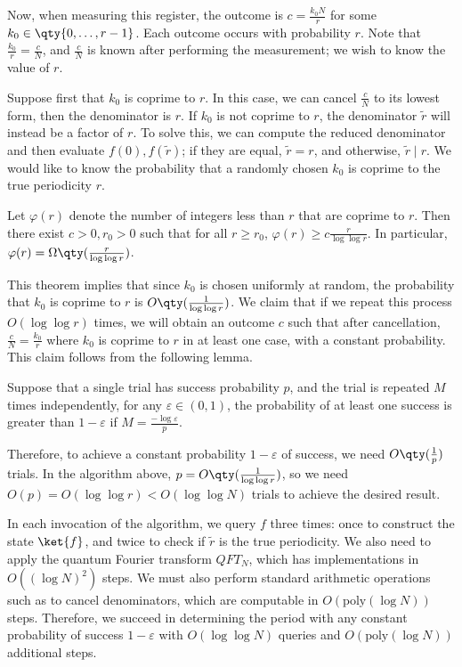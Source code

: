 Now, when measuring this register, the outcome is $c = \frac{k_0N}{r}$ for some $k_0 \in \qty{0, \dots, r-1}$.
Each outcome occurs with probability $r$.
Note that $\frac{k_0}{r} = \frac{c}{N}$, and $\frac{c}{N}$ is known after performing the measurement; we wish to know the value of $r$.

Suppose first that $k_0$ is coprime to $r$.
In this case, we can cancel $\frac{c}{N}$ to its lowest form, then the denominator is $r$.
If $k_0$ is not coprime to $r$, the denominator $\widetilde r$ will instead be a factor of $r$.
To solve this, we can compute the reduced denominator and then evaluate $f(0), f(\widetilde r)$; if they are equal, $\widetilde r = r$, and otherwise, $\widetilde r \mid r$.
We would like to know the probability that a randomly chosen $k_0$ is coprime to the true periodicity $r$.
\begin{theorem}
    Let $\varphi(r)$ denote the number of integers less than $r$ that are coprime to $r$.
    Then there exist $c > 0, r_0 > 0$ such that for all $r \geq r_0$, $\varphi(r) \geq c \frac{r}{\log \log r}$.
    In particular, $\varphi(r) = \Omega\qty(\frac{r}{\log \log r})$.
\end{theorem}
This theorem implies that since $k_0$ is chosen uniformly at random, the probability that $k_0$ is coprime to $r$ is $O\qty(\frac{1}{\log \log r})$.
We claim that if we repeat this process $O(\log \log r)$ times, we will obtain an outcome $c$ such that after cancellation, $\frac{c}{N} = \frac{k_0}{r}$ where $k_0$ is coprime to $r$ in at least one case, with a constant probability.
This claim follows from the following lemma.
\begin{lemma}
    Suppose that a single trial has success probability $p$, and the trial is repeated $M$ times independently, for any $\varepsilon \in (0,1)$, the probability of at least one success is greater than $1 - \varepsilon$ if $M = \frac{-\log \varepsilon}{p}$.
\end{lemma}
Therefore, to achieve a constant probability $1 - \varepsilon$ of success, we need $O\qty(\frac{1}{p})$ trials.
In the algorithm above, $p = O\qty(\frac{1}{\log \log r})$, so we need $O(p) = O(\log \log r) < O(\log \log N)$ trials to achieve the desired result.

In each invocation of the algorithm, we query $f$ three times: once to construct the state $\ket{f}$, and twice to check if $\widetilde r$ is the true periodicity.
We also need to apply the quantum Fourier transform $QFT_N$, which has implementations in $O((\log N)^2)$ steps.
We must also perform standard arithmetic operations such as to cancel denominators, which are computable in $O(\mathrm{poly}(\log N))$ steps.
Therefore, we succeed in determining the period with any constant probability of success $1 - \varepsilon$ with $O(\log \log N)$ queries and $O(\mathrm{poly}(\log N))$ additional steps.

